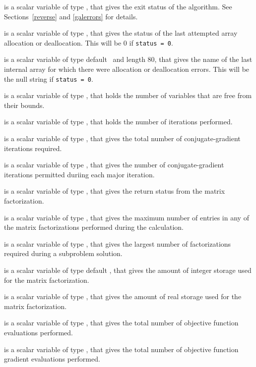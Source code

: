 \documentclass{galahad}
\begin{document}
\begin{description}
 is a scalar variable of type \integer, that gives the
exit status of the algorithm.
See Sections~\ref{reverse} and \ref{galerrors}
for details.

 is a scalar variable of type \integer, that gives
the status of the last attempted array allocation or deallocation.
This will be 0 if {\tt status = 0}.

 is a scalar variable of type default \character\
and length 80, that  gives the name of the last internal array
for which there were allocation or deallocation errors.
This will be the null string if {\tt status = 0}.

 is a scalar variable of type \integer, that holds the
number of variables that are free from their bounds.

 is a scalar variable of type \integer, that holds the
number of iterations performed.

 is a scalar variable of type \integer, that gives the
total number of conjugate-gradient iterations required.

 is a scalar variable of type \integer, that gives the
number of conjugate-gradient iterations permitted duriing each major iteration.

 is a scalar variable of type \integer, that
gives the return status from the matrix factorization.

 is a scalar variable of type \longinteger, that
gives the maximum number of entries in any of the matrix factorizations
performed during the calculation.

 is a scalar variable of type \integer, that
gives the largest number of factorizations required during a subproblem
solution.

 is a scalar variable of type default
\integer, that gives the amount of integer storage used for the matrix
factorization.

 is a scalar variable of type \integer,
that gives the amount of real storage used for the matrix factorization.

 is a scalar variable of type \integer, that gives the
total number of objective function evaluations performed.

 is a scalar variable of type \integer, that gives the
total number of objective function gradient evaluations performed.


\end{description}
\end{document}
